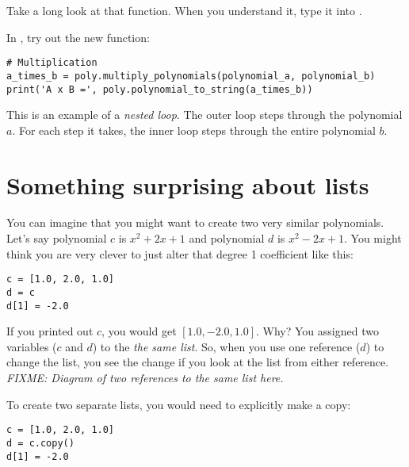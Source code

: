 Take a long look at that function.  When you understand it, type it into .

In , try out the new function:
\begin{Verbatim}
# Multiplication
a_times_b = poly.multiply_polynomials(polynomial_a, polynomial_b)
print('A x B =', poly.polynomial_to_string(a_times_b))
\end{Verbatim}

This is an example of a \emph{nested loop}. The outer loop steps
through the polynomial $a$. For each step it takes, the inner loop
steps through the entire polynomial $b$.

\section{Something surprising about lists}

You can imagine that you might want to create two very similar polynomials. Let's say polynomial $c$ is $x^2 + 2x + 1$ and polynomial $d$ is $x^2 -2x + 1$.  You might think you are very clever to just alter that degree 1 coefficient like this:
\begin{Verbatim}
c = [1.0, 2.0, 1.0]
d = c
d[1] = -2.0
\end{Verbatim}

If you printed out $c$, you would get $[1.0, -2.0, 1.0]$.  Why? You
assigned two variables ($c$ and $d$) to the \emph{the same list}.  So,
when you use one reference ($d$) to change the list, you see the
change if you look at the list from either reference. \emph{FIXME:
  Diagram of two references to the same list here.}

To create two separate lists, you would need to explicitly make a copy:
\begin{Verbatim}
c = [1.0, 2.0, 1.0]
d = c.copy()
d[1] = -2.0
\end{Verbatim}

